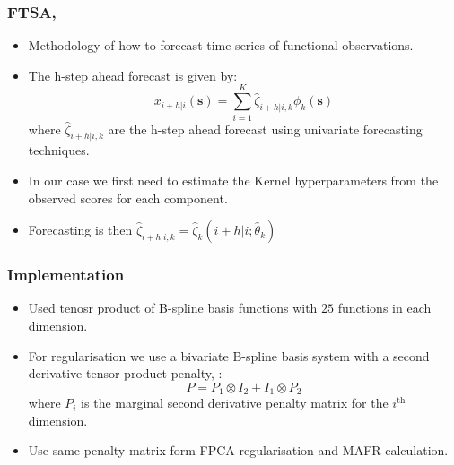 \documentclass[aspectratio=169]{beamer}
\newcommand{\ve}[1]{\bm{{#1}}}
\begin{document}
  \begin{frame}
    \frametitle{FTSA, \cite{shang_ftsa_2013}}
    \begin{itemize}
      \item Methodology of how to forecast time series of functional observations.
      \item The h-step ahead forecast is given by:
        \begin{equation}
          x_{i+h | i} (\ve{s}) = \sum_{i=1}^{K} \hat{\zeta}_{i+h|i, k} \phi_k(\ve{s})
          \label{eqn:score_for}
        \end{equation}
        where $\hat{\zeta}_{i+h | i, k}$ are the h-step ahead forecast using univariate forecasting techniques. 
      \item In our case we first need to estimate the Kernel hyperparameters from the observed scores for each component. 
      \item Forecasting is then $\hat{\zeta}_{i+h | i, k} = \hat{\zeta}_k(i+h | i; \hat{\theta}_k)$ 
    \end{itemize}
  \end{frame}

  \begin{frame}
    \frametitle{Implementation}
    \begin{itemize}
      \item Used tenosr product of B-spline basis functions with $25$ functions in each dimension.
      \item For regularisation we use a bivariate B-spline basis system with a second derivative tensor product penalty, \cite{wood_low-rank_2006}:
        \begin{equation}
          P = P_1 \otimes I_2 + I_1 \otimes P_2 
          \label{eqn:reg}
        \end{equation}
        where $P_i$ is the marginal second derivative penalty matrix for the $i^\text{th}$ dimension.
      \item Use same penalty matrix form FPCA regularisation and MAFR calculation.   
    \end{itemize}
  \end{frame}
  
\end{document}
